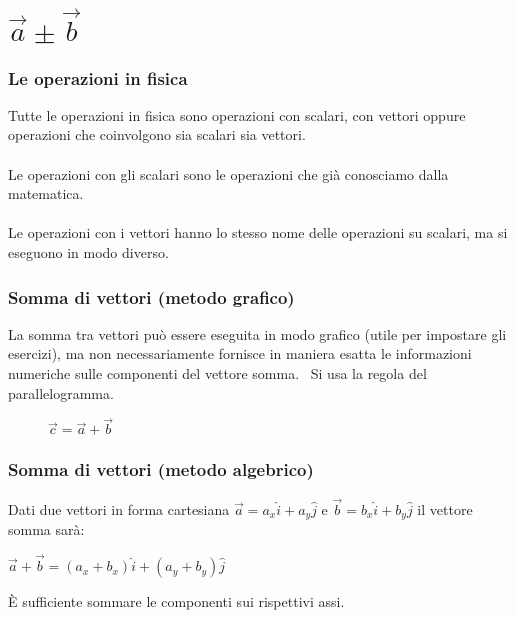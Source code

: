 \documentclass[]{beamer}
\theoremstyle{plain}
\begin{document}
\section{$ \vec{a} \pm \vec{b} $}

\begin{frame}
  \frametitle{Le operazioni in fisica}
  Tutte le operazioni in fisica sono operazioni con scalari, con vettori oppure operazioni che coinvolgono sia scalari sia vettori.\\~\pause\\Le operazioni con gli scalari sono le operazioni che già conosciamo dalla matematica.\\~\pause\\\alert{Le operazioni con i vettori} hanno lo stesso nome delle operazioni su scalari, ma \alert{si eseguono in modo diverso}.
\end{frame}



\begin{frame}
  \frametitle{Somma di vettori (metodo grafico)}
  La somma tra vettori può essere eseguita in modo grafico (utile per impostare gli esercizi), ma non necessariamente fornisce in maniera esatta le informazioni numeriche sulle componenti del vettore somma.{~\pause} Si usa la \alert {regola del parallelogramma}.
  
  
\begin{figure}

\colorbox{blue!30}{ $ \vec{c} = \vec{a} + \vec{b} $ }
\end{figure}
\end{frame}


\begin{frame}
  \frametitle{Somma di vettori (metodo algebrico)}
  Dati due vettori in forma cartesiana $ \vec{a} = a_x \hat{i} + a_y \hat{j} $ e  $ \vec{b} = b_x \hat{i} + b_y \hat{j} $ il vettore somma sarà: 
 \begin{center}
 \colorbox{blue!30}{ $  \vec{a} + \vec{b} =  (a_x + b_x) \hat{i} + (a_y + b_y) \hat{j} $ }
 \end{center}
 È sufficiente sommare le componenti sui rispettivi assi.
\end{frame}
\end{document}

